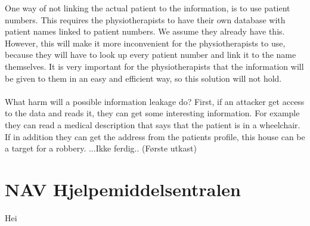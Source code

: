 One way of not linking the actual patient to the information, is to use patient numbers. This requires the physiotherapists to have their own database with patient names linked to patient numbers. We assume they already have this. However, this will make it more inconvenient for the physiotherapists to use, because they will have to look up every patient number and link it to the name themselves. It is very important for the physiotherapists that the information will be given to them in an easy and efficient way, so this solution will not hold. \\ \\
What harm will a possible information leakage do? First, if an attacker get access to the data and reads it, they can get some interesting information. For example they can read a medical description that says that the patient is in a wheelchair. If in addition they can get the address from the patients profile, this house can be a target for a robbery. ...Ikke ferdig.. (Første utkast)

\section{NAV Hjelpemiddelsentralen}
Hei

